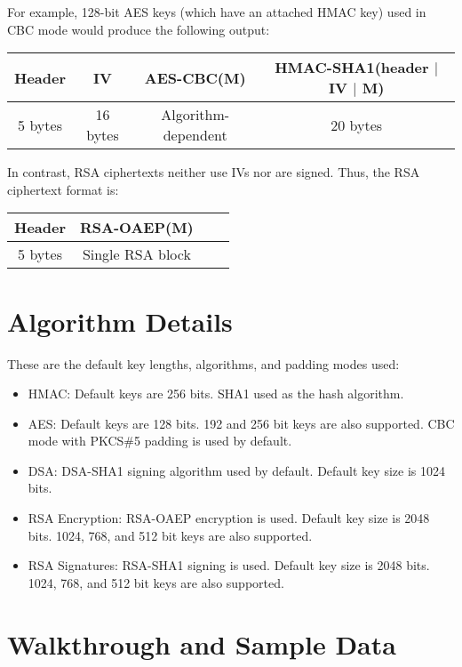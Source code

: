\documentclass{llncs}
\begin{document}
For example, 128-bit AES keys (which have an attached HMAC key) used in CBC
mode would produce the following output:

\vspace*{3mm}
\begin{tabular}{| c | c | c | c |}
\hline
Header & IV & AES-CBC(M) & HMAC-SHA1(header $|$ IV $|$ M) \\ \hline
5 bytes & 16 bytes & Algorithm-dependent & 20 bytes \\
\hline
\end{tabular}
\vspace*{3mm}

In contrast, RSA ciphertexts neither use IVs nor are signed. Thus, the RSA
ciphertext format is:

\vspace*{3mm}
\begin{tabular}{| c | c | c | c |}
\hline
Header & RSA-OAEP(M)  \\ \hline
5 bytes & Single RSA block  \\
\hline
\end{tabular}
\vspace*{3mm}

\section{Algorithm Details}

These are the default key lengths, algorithms, and padding modes used:

\begin{itemize}
  \item HMAC: Default keys are 256 bits. SHA1 used as the hash
  algorithm.
  \item AES: Default keys are 128 bits. 192 and 256 bit keys are also supported.
  CBC mode with PKCS\#5 padding is used by default.
  \item DSA: DSA-SHA1 signing algorithm used by default. Default key size is
  1024 bits.
  \item RSA Encryption: RSA-OAEP encryption is used. Default key size is 2048
  bits. 1024, 768, and 512 bit keys are also supported.
  \item RSA Signatures: RSA-SHA1 signing is used. Default key size is 2048
  bits. 1024, 768, and 512 bit keys are also supported.
\end{itemize}


\section{Walkthrough and Sample Data}\label{walkthrough}
\end{document}
